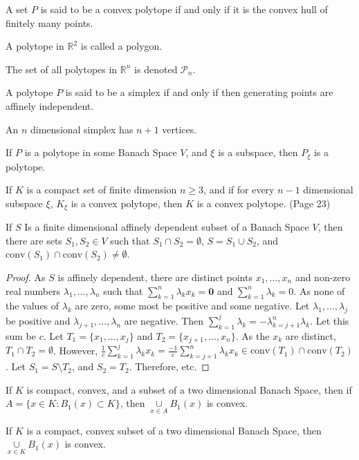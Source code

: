         \begin{definition}
        A set $P$ is said to be a convex polytope if and only if it is the convex hull of finitely many points.
        \end{definition}
        \begin{definition}
        A polytope in $\mathbb{R}^2$ is called a polygon.
        \end{definition}
        The set of all polytopes in $\mathbb{R}^n$ is denoted $\mathscr{P}_n$.
        \begin{definition}
        A polytope $P$ is said to be a simplex if and only if then generating points are affinely independent.
        \end{definition}
        \begin{theorem}
        An $n$ dimensional simplex has $n+1$ vertices.
        \end{theorem}
        \begin{theorem}
        If $P$ is a polytope in some Banach Space $V$, and $\xi$ is a subspace, then $P_{\xi}$ is a polytope.
        \end{theorem}
        \begin{theorem}
        If $K$ is a compact set of finite dimension $n\geq 3$, and if for every $n-1$ dimensional subspace $\xi$, $K_{\xi}$ is a convex polytope, then $K$ is a convex polytope. (Page 23)
        \end{theorem}
        \begin{theorem}
        If $S$ Is a finite dimensional affinely dependent subset of a Banach Space $V$, then there are sets $S_1,S_2\in V$ such that $S_1\cap S_2 = \emptyset$, $S=S_1\cup S_2$, and $\textrm{conv}(S_1)\cap \textrm{conv}(S_2) \ne \emptyset$.
        \end{theorem}
        \begin{proof}
        As $S$ is affinely dependent, there are distinct points $x_1,\hdots,x_n$ and non-zero real numbers $\lambda_1,\hdots,\lambda_n$ such that $\sum_{k=1}^{n}\lambda_k x_k= \mathbf{0}$ and $\sum_{k=1}^{n}\lambda_k = 0$. As none of the values of $\lambda_k$ are zero, some most be positive and some negative. Let $\lambda_1,\hdots, \lambda_j$ be positive and $\lambda_{j+1},\hdots, \lambda_n$ are negative. Then $\sum_{k=1}^{j} \lambda_k = - \lambda_{k=j+1}^{n}\lambda_k$. Let this sum be $c$. Let $T_1 = \{x_1,\hdots, x_j\}$ and $T_2=\{x_{j+1},\hdots, x_{n}\}$. As the $x_k$ are distinct, $T_1\cap T_2 = \emptyset$. However, $\frac{1}{c}\sum_{k=1}^{j}\lambda_k x_k = \frac{-1}{c}\sum_{k=j+1}^{n} \lambda_k x_k \in\textrm{conv}(T_1)\cap \textrm{conv}(T_2)$. Let $S_1 = S\setminus T_2$, and $S_2 = T_2$. Therefore, etc.
        \end{proof}
        \begin{theorem}
        If $K$ is compact, convex, and a subset of a two dimensional Banach Space, then if $A = \{x\in K:B_{1}(x)\subset K\}$, then $\underset{x\in A}\cup B_{1}(x)$ is convex.
        \end{theorem}
        \begin{theorem}
        If $K$ is a compact, convex subset of a two dimensional Banach Space, then $\underset{x\in K}\cup B_{1}(x)$ is convex.
        \end{theorem}
